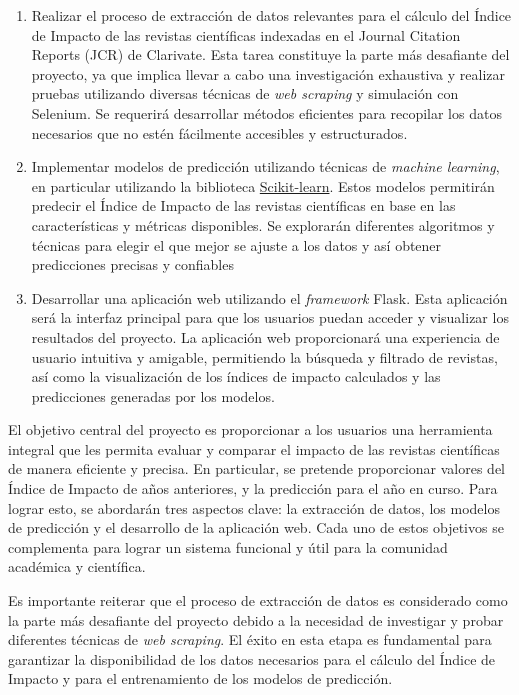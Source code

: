 \begin{enumerate}
    \item Realizar el proceso de extracción de datos relevantes para el cálculo del Índice de Impacto de las revistas científicas indexadas en el Journal Citation Reports (JCR) de Clarivate. Esta tarea constituye la parte más desafiante del proyecto, ya que implica llevar a cabo una investigación exhaustiva y realizar pruebas utilizando diversas técnicas de \textit{web scraping} y simulación con Selenium. Se requerirá desarrollar métodos eficientes para recopilar los datos necesarios que no estén fácilmente accesibles y estructurados.
    
    \item Implementar modelos de predicción utilizando técnicas de \textit{machine learning}, en particular utilizando la biblioteca \href{https://scikit-learn.org/stable/index.html}{Scikit-learn}. Estos modelos permitirán predecir el Índice de Impacto de las revistas científicas en base en las características y métricas disponibles. Se explorarán diferentes algoritmos y técnicas para elegir el que mejor se ajuste a los datos y así obtener predicciones precisas y confiables
    
    \item Desarrollar una aplicación web utilizando el \textit{framework} Flask. Esta aplicación será la interfaz principal para que los usuarios puedan acceder y visualizar los resultados del proyecto. La aplicación web proporcionará una experiencia de usuario intuitiva y amigable, permitiendo la búsqueda y filtrado de revistas, así como la visualización de los índices de impacto calculados y las predicciones generadas por los modelos.
\end{enumerate}

El objetivo central del proyecto es proporcionar a los usuarios una herramienta integral que les permita evaluar y comparar el impacto de las revistas científicas de manera eficiente y precisa. En particular, se pretende proporcionar valores del Índice de Impacto de años anteriores, y la predicción para el año en curso. Para lograr esto, se abordarán tres aspectos clave: la extracción de datos, los modelos de predicción y el desarrollo de la aplicación web. Cada uno de estos objetivos se complementa para lograr un sistema funcional y útil para la comunidad académica y científica.

Es importante reiterar que el proceso de extracción de datos es considerado como la parte más desafiante del proyecto debido a la necesidad de investigar y probar diferentes técnicas de \textit{web scraping}. El éxito en esta etapa es fundamental para garantizar la disponibilidad de los datos necesarios para el cálculo del Índice de Impacto y para el entrenamiento de los modelos de predicción.


